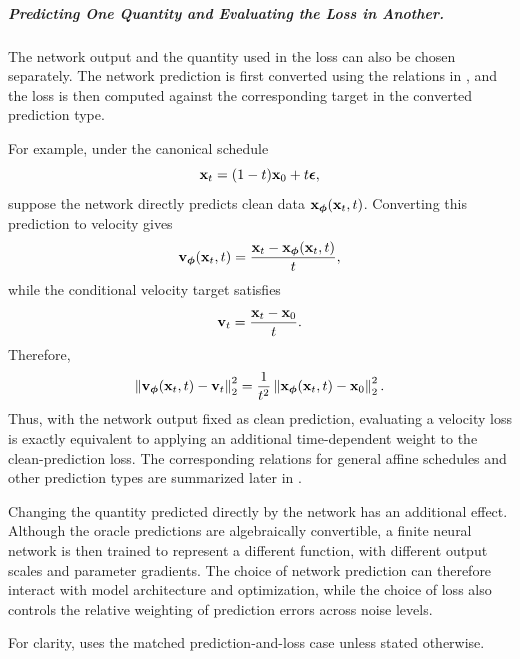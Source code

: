 \subparagraph{Predicting One Quantity and Evaluating the Loss in Another.}
The network output and the quantity used in the loss can also be chosen
separately. The network prediction is first converted using the relations in
, and the loss is then computed against the
corresponding target in the converted prediction type.

For example, under the canonical schedule
\[
{\mathbf{x}}_t=(1-t){\mathbf{x}}_0+t{\bm{\epsilon}},
\]
suppose the network directly predicts clean data
${\mathbf{x}}_{\bm{\phi}}({\mathbf{x}}_t,t)$. Converting this prediction to velocity gives
\[
{\mathbf{v}}_{\bm{\phi}}({\mathbf{x}}_t,t)
=
\frac{{\mathbf{x}}_t-{\mathbf{x}}_{\bm{\phi}}({\mathbf{x}}_t,t)}{t},
\]
while the conditional velocity target satisfies
\[
{\mathbf{v}}_t
=
\frac{{\mathbf{x}}_t-{\mathbf{x}}_0}{t}.
\]
Therefore,
\[
\left\|
{\mathbf{v}}_{\bm{\phi}}({\mathbf{x}}_t,t)-{\mathbf{v}}_t
\right\|_2^2
=
\frac{1}{t^2}
\left\|
{\mathbf{x}}_{\bm{\phi}}({\mathbf{x}}_t,t)-{\mathbf{x}}_0
\right\|_2^2.
\]
Thus, with the network output fixed as clean prediction, evaluating a velocity
loss is exactly equivalent to applying an additional time-dependent weight to
the clean-prediction loss. The corresponding relations for general affine
schedules and other prediction types are summarized later in
.

Changing the quantity predicted directly by the network has an additional
effect. Although the oracle predictions are algebraically convertible, a
finite neural network is then trained to represent a different function, with
different output scales and parameter gradients. The choice of network
prediction can therefore interact with model architecture and optimization,
while the choice of loss also controls the relative weighting of prediction
errors across noise levels.

For clarity,  uses the matched prediction-and-loss
case unless stated otherwise.









